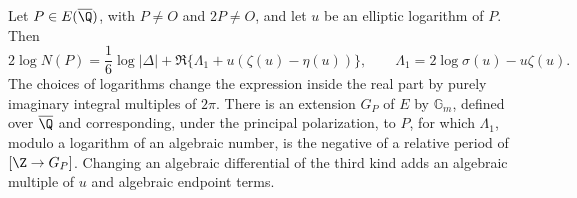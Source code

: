 \begin{proposition}\label{ari:C.7.1}
Let $P\in E(\overline\Q)$, with $P\ne O$ and $2P\ne O$, and
let $u$ be an elliptic logarithm of $P$. Then
\begin{equation}\label{ari:eq:cp-sigma}
 2\log N(P)=\frac16\log|\Delta|
       +\Re\{\Lambda_1+u(\zeta(u)-\eta(u))\},
 \qquad \Lambda_1=2\log\sigma(u)-u\zeta(u).
\end{equation}
The choices of logarithms change the expression inside the real
part by purely imaginary integral multiples of $2\pi$.
There is an extension $G_P$ of $E$ by $\mathbb G_m$, defined
over $\overline\Q$ and corresponding, under the principal
polarization, to $P$, for which $\Lambda_1$, modulo a logarithm
of an algebraic number, is the negative of a relative period
of $[\Z\to G_P]$. Changing an algebraic differential of the
third kind adds an algebraic multiple of $u$ and algebraic
endpoint terms.
\end{proposition}
